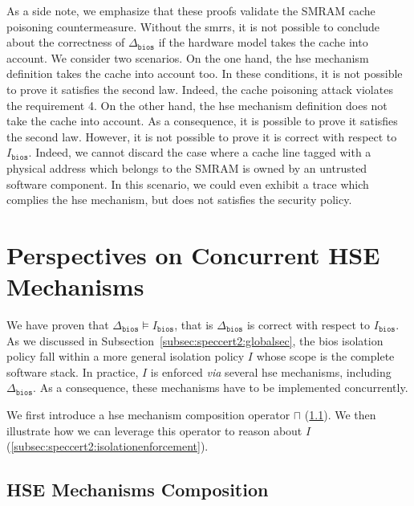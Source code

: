 As a side note, we emphasize that these proofs validate the SMRAM cache
poisoning countermeasure.
%
Without the \acp{smrr}, it is not possible to conclude about the correctness of
\( \Delta_{\mathtt{bios}} \) if the hardware model takes the cache into account.
%
We consider two scenarios.
%
On the one hand, the \ac{hse} mechanism definition takes the cache into account
too.
%
In these conditions, it is not possible to prove it satisfies the second law.
%
Indeed, the cache poisoning attack violates the requirement 4.
%
On the other hand, the \ac{hse} mechanism definition does not take the cache
into account.
%
As a consequence, it is possible to prove it satisfies the second law.
%
However, it is not possible to prove it is correct with respect to
$I_{\mathtt{bios}}$.
%
Indeed, we cannot discard the case where a cache line tagged with a physical
address which belongs to the SMRAM is owned by an untrusted software component.
%
In this scenario, we could even exhibit a trace which complies the \ac{hse}
mechanism, but does not satisfies the security policy.

\section{Perspectives on Concurrent HSE Mechanisms}
\label{subsec:speccert2:coop}

We have proven that \( \Delta_{\mathtt{bios}} \models I_{\mathtt{bios}} \), that
is \( \Delta_{\mathtt{bios}} \) is correct with respect to
\( I_{\mathtt{bios}} \).
%
As we discussed in Subsection~\ref{subsec:speccert2:globalsec}, the \ac{bios}
isolation policy fall within a more general isolation policy \( I \) whose scope
is the complete software stack.
%
In practice, \( I \) is enforced \emph{via} several \ac{hse} mechanisms,
including \( \Delta_{\mathtt{bios}} \).
%
As a consequence, these mechanisms have to be implemented concurrently.

We first introduce a \ac{hse} mechanism composition operator \( \sqcap \)
(\ref{subsec:speccert2:compo}).
%
We then illustrate how we can leverage this operator to reason about \( I \)
(\ref{subsec:speccert2:isolationenforcement}).
%

\subsection{HSE Mechanisms Composition}
\label{subsec:speccert2:compo}

